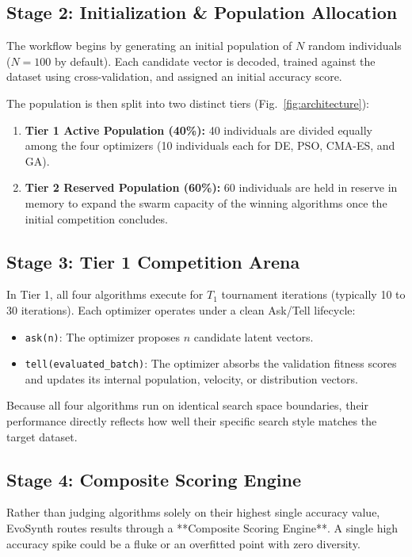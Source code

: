 \documentclass[conference]{IEEEtran}
\begin{document}
\subsection{Stage 2: Initialization & Population Allocation}
The workflow begins by generating an initial population of $N$ random individuals ($N = 100$ by default). Each candidate vector is decoded, trained against the dataset using cross-validation, and assigned an initial accuracy score.

The population is then split into two distinct tiers (Fig.~\ref{fig:architecture}):
\begin{enumerate}
    \item \textbf{Tier 1 Active Population (40\%):} 40 individuals are divided equally among the four optimizers (10 individuals each for DE, PSO, CMA-ES, and GA).
    \item \textbf{Tier 2 Reserved Population (60\%):} 60 individuals are held in reserve in memory to expand the swarm capacity of the winning algorithms once the initial competition concludes.
\end{enumerate}

\subsection{Stage 3: Tier 1 Competition Arena}
In Tier 1, all four algorithms execute for $T_1$ tournament iterations (typically 10 to 30 iterations). Each optimizer operates under a clean Ask/Tell lifecycle:
\begin{itemize}
    \item \texttt{ask(n)}: The optimizer proposes $n$ candidate latent vectors.
    \item \texttt{tell(evaluated\_batch)}: The optimizer absorbs the validation fitness scores and updates its internal population, velocity, or distribution vectors.
\end{itemize}
Because all four algorithms run on identical search space boundaries, their performance directly reflects how well their specific search style matches the target dataset.

\subsection{Stage 4: Composite Scoring Engine}
Rather than judging algorithms solely on their highest single accuracy value, EvoSynth routes results through a **Composite Scoring Engine**. A single high accuracy spike could be a fluke or an overfitted point with zero diversity. 
\end{document}
